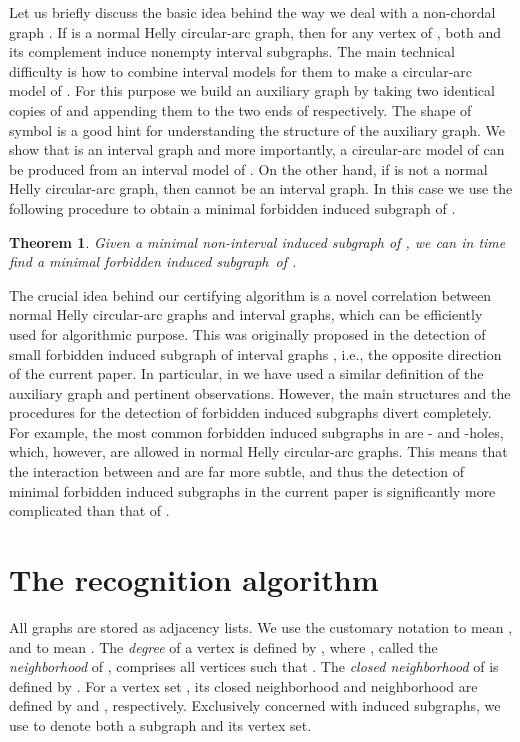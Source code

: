 \documentclass[10pt]{article}
\newtheorem{theorem}{Theorem}[section]
\newcommand{\badgraph}{minimal forbidden induced subgraph}
\newcommand{\nhcag}{normal Helly circular-arc graph}
\begin{document}
Let us briefly discuss the basic idea behind the way we deal with a
non-chordal graph .  If  is a \nhcag, then for any vertex  of
, both  and its complement induce nonempty interval
subgraphs.  The main technical difficulty is how to combine interval
models for them to make a circular-arc model of .  For this purpose
we build an auxiliary graph  by taking two identical copies
of  and appending them to the two ends of 
respectively.  {The shape of symbol  is a good hint for
  understanding the structure of the auxiliary graph.} We show that
 is an interval graph and more importantly, a circular-arc
model of  can be produced from an interval model of .  On
the other hand, if  is not a \nhcag, then  cannot be an
interval graph.  In this case we use the following procedure to obtain
a minimal forbidden induced subgraph of .
\begin{theorem}\label{thm:negative-certificate}
  Given a minimal non-interval induced subgraph of , we can
  in  time find a \badgraph\ of .
\end{theorem}
The crucial idea behind our certifying algorithm is a novel
correlation between normal Helly circular-arc graphs and interval
graphs, which can be efficiently used for algorithmic purpose.  This
was originally proposed in the detection of small forbidden induced
subgraph of interval graphs \cite{cao-14-almost-interval-recognition},
i.e., the opposite direction of the current paper.  In particular, in
\cite{cao-14-almost-interval-recognition} we have used a similar
definition of the auxiliary graph and pertinent observations.
However, the main structures and the procedures for the detection of
forbidden induced subgraphs divert completely.  For example, the most
common forbidden induced subgraphs in
\cite{cao-14-almost-interval-recognition} are - and -holes,
which, however, are allowed in normal Helly circular-arc graphs.  This
means that the interaction between  and  are far more
subtle, and thus the detection of \badgraph s in the current paper is
significantly more complicated than that of
\cite{cao-14-almost-interval-recognition}.

\section{The recognition algorithm}\label{sec:recognition}
All graphs are stored as adjacency lists.  We use the customary
notation  to mean , and  to mean .  The \emph{degree} of a vertex  is defined by , where , called the \emph{neighborhood} of ,
comprises all vertices  such that .  The \emph{closed
  neighborhood} of  is defined by .  For a
vertex set , its closed neighborhood and neighborhood are defined
by  and ,
respectively.  Exclusively concerned with induced subgraphs, we use
 to denote both a subgraph and its vertex set.
\end{document}
